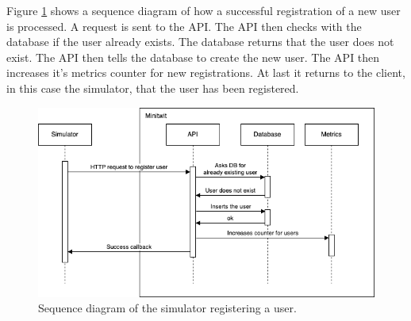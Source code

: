 Figure \ref{fig:register_sequence} shows a sequence diagram of how a successful registration of a new user is processed. A request is sent to the API. The API then checks with the database if the user already exists. The database returns that the user does not exist. The API then tells the database to create the new user. The API then increases it's metrics counter for new registrations. At last it returns to the client, in this case the simulator, that the user has been registered.
\begin{figure}[H]
    \centering
    \includegraphics[width=\textwidth]{diagrams/register_sequence.png}
    \caption{Sequence diagram of the simulator registering a user.}
    \label{fig:register_sequence}
\end{figure}

